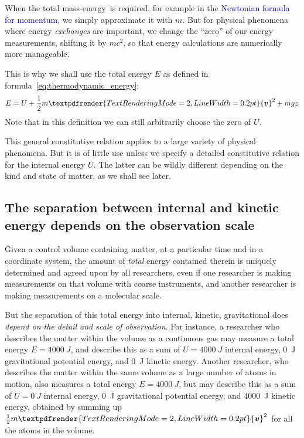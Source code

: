 \documentclass[a4paper,12pt,%
onecolumn,oneside,%
british%
]{memoir}
\renewcommand*{\bm}[1]{\textpdfrender{TextRenderingMode=2,LineWidth=0.2pt}{\boldsymbol{#1}}}
\renewcommand*{\|}[1][]{\nonscript\:#1\vert\nonscript\:\mathopen{}}
\newcommand*{\sect}{\S}%
\renewcommand*{\autoref}[2]{\sidepar{\vspace{-1ex}\footnotesize{\color{blue}\faIcon{%
angle-right%
}\enskip\sect~\ref{#1} page~\pageref{#1}}}\textcolor{blue}{#2}}
\newcommand*{\masse}{mass-energy}
\newcommand*{\yv}{\bm{v}}
\newcommand*{\ym}{m}%
\newcommand*{\yE}{E}
\newcommand*{\yU}{U}
\begin{document}
\medskip

When the total \masse\ is required, for example in the \autoref{eq:matter_momentum_Newton}{Newtonian formula for momentum}, we simply approximate it with $\ym$. But for physical phenomena where energy \emph{exchanges} are important, we change the \enquote{zero} of our energy measurements, shifting it by $\ym c^{2}$, so that energy calculations are numerically more manageable.

This is why we shall use the total energy $\yE$ as defined in formula~\eqref{eq:thermodynamic_energy}:
\begin{equation*}
  \yE = \yU + \frac{1}{2}\ym \yv^{2} + \ym g z
\end{equation*}
Note that in this definition we can still arbitrarily choose the zero of $\yU$.

\medskip

This general constitutive relation applies to a large variety of physical phenomena. But it is of little use unless we specify a detailed constitutive relation for the internal energy $\yU$. The latter can be wildly different depending on the kind and state of matter, as we shall see later.

\subsection{The separation between internal and kinetic energy depends on the observation scale}
\label{sec:dependence_energycontentdivision}

Given a control volume containing matter, at a particular time and in a coordinate system, the amount of \emph{total} energy contained therein is uniquely determined and agreed upon by all researchers, even if one researcher is making measurements on that volume with coarse instruments, and another researcher is making measurements on a molecular scale.

But the separation of this total energy into internal, kinetic, gravitational does \emph{depend on the detail and scale of observation}. For instance, a researcher who describes the matter within the volume as a continuous gas may measure a total energy $\yE=\qty{4000}{J}$, and describe this as a sum of $\yU=\qty{4000}{J}$ internal energy, \qty{0}{J} gravitational potential energy, and \qty{0}{J} kinetic energy. Another researcher, who describes the matter within the same volume as a large number of atoms in motion, also measures a total energy $\yE=\qty{4000}{J}$, but may describe this as a sum of $\yU=\qty{0}{J}$ internal energy, \qty{0}{J} gravitational potential energy, and \qty{4000}{J} kinetic energy, obtained by summing up $\tfrac12\ym\yv^{2}$ for all the atoms in the volume.
\end{document}
